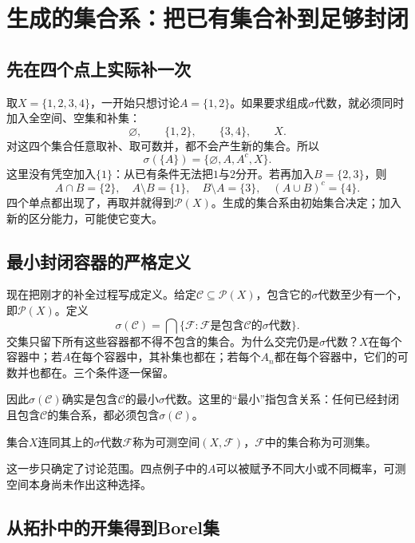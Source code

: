 \section{生成的集合系：把已有集合补到足够封闭}

\subsection{先在四个点上实际补一次}

取$X=\{1,2,3,4\}$，一开始只想讨论$A=\{1,2\}$。如果要求组成$\sigma$代数，就必须同时加入全空间、空集和补集：
\[
 \varnothing,\qquad \{1,2\},\qquad \{3,4\},\qquad X.
\]
对这四个集合任意取补、取可数并，都不会产生新的集合。所以
\[
 \sigma(\{A\})=\{\varnothing,A,A^c,X\}.
\]
这里没有凭空加入$\{1\}$：从已有条件无法把$1$与$2$分开。若再加入$B=\{2,3\}$，则
\[
 A\cap B=\{2\},\quad A\setminus B=\{1\},\quad
 B\setminus A=\{3\},\quad(A\cup B)^c=\{4\}.
\]
四个单点都出现了，再取并就得到$\mathcal P(X)$。生成的集合系由初始集合决定；加入新的区分能力，可能使它变大。

\subsection{最小封闭容器的严格定义}

现在把刚才的补全过程写成定义。给定$\mathcal C\subseteq\mathcal P(X)$，包含它的$\sigma$代数至少有一个，即$\mathcal P(X)$。定义
\[
 \sigma(\mathcal C)
 =\bigcap\{\mathcal F:\mathcal F\text{是包含}\mathcal C
                  \text{的}\sigma\text{代数}\}.
\]
交集只留下所有这些容器都不得不包含的集合。为什么交完仍是$\sigma$代数？$X$在每个容器中；若$A$在每个容器中，其补集也都在；若每个$A_n$都在每个容器中，它们的可数并也都在。三个条件逐一保留。

因此$\sigma(\mathcal C)$确实是包含$\mathcal C$的最小$\sigma$代数。这里的“最小”指包含关系：任何已经封闭且包含$\mathcal C$的集合系，都必须包含$\sigma(\mathcal C)$。

\begin{definition}[可测空间]
集合$X$连同其上的$\sigma$代数$\mathcal F$称为可测空间$(X,\mathcal F)$，$\mathcal F$中的集合称为可测集。
\end{definition}

这一步只确定了讨论范围。四点例子中的$A$可以被赋予不同大小或不同概率，可测空间本身尚未作出这种选择。

\subsection{从拓扑中的开集得到Borel集}

